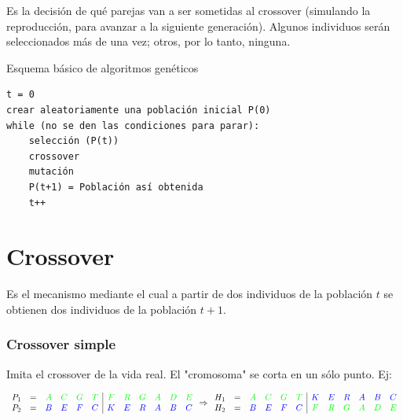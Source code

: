 \documentclass[10pt,a4paper]{article}
\begin{document}
Es la decisión de qué parejas van a ser sometidas al crossover (simulando la reproducción, para avanzar a la siguiente generación). Algunos individuos serán seleccionados más de una vez; otros, por lo tanto, ninguna.

Esquema básico de algoritmos genéticos


    \begin{lstlisting}[language=pseudo]
t = 0
crear aleatoriamente una población inicial P(0)
while (no se den las condiciones para parar):
    selección (P(t))
    crossover
    mutación
    P(t+1) = Población así obtenida
    t++
\end{lstlisting}

\section*{Crossover}

Es el mecanismo mediante el cual a partir de dos individuos de la población $t$ se obtienen dos individuos de la población $t+1$.

\subsubsection*{Crossover simple}

Imita el crossover de la vida real. El "cromosoma" se corta en un sólo punto. Ej:

\begin{center}
$\begin{array}{cccccc|cccccc} P_1 &= &\color{green} A&\color{green}C&\color{green}G&\color{green}T&\color{green}F&\color{green}R&\color{green}G&\color{green}A&\color{green}D&\color{green}E\\ P_2 &= & \color{blue}B&\color{blue}E&\color{blue}F&\color{blue}C&\color{blue}K&\color{blue}E&\color{blue}R&\color{blue}A&\color{blue}B&\color{blue}C\\ \end{array} \Rightarrow \begin{array}{cccccc|cccccc} H_1 &= &\color{green} A&\color{green}C&\color{green}G&\color{green}T&\color{blue}K&\color{blue}E&\color{blue}R&\color{blue}A&\color{blue}B&\color{blue}C\\ H_2 &= & \color{blue}B&\color{blue}E&\color{blue}F&\color{blue}C&\color{green}F&\color{green}R&\color{green}G&\color{green}A&\color{green}D&\color{green}E\\ \end{array}$
\end{center}
\end{document}
